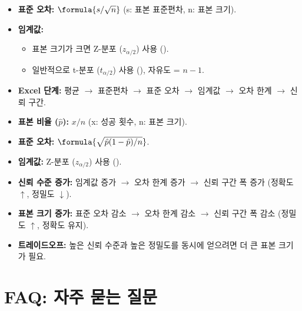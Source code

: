 \documentclass[11pt,a4paper]{article}
\theoremstyle{definition}
\begin{document}
\begin{infobox}[title=\textbf{모집단 평균에 대한 신뢰 구간}]
\begin{itemize}
    \item \textbf{표준 오차:} $\formula{s / \sqrt{n}}$ (s: 표본 표준편차, n: 표본 크기).
    \item \textbf{임계값:}
    \begin{itemize}
        \item 표본 크기가 크면 Z-분포 ($z_{\alpha/2}$) 사용 ().
        \item 일반적으로 t-분포 ($t_{\alpha/2}$) 사용 (), 자유도 = $n-1$.
    \end{itemize}
    \item \textbf{Excel 단계:} 평균 $\rightarrow$ 표준편차 $\rightarrow$ 표준 오차 $\rightarrow$ 임계값 $\rightarrow$ 오차 한계 $\rightarrow$ 신뢰 구간.
\end{itemize}
\end{infobox}

\begin{importantbox}[title=\textbf{모집단 비율에 대한 신뢰 구간}]
\begin{itemize}
    \item \textbf{표본 비율 ($\hat{p}$):} $x/n$ (x: 성공 횟수, n: 표본 크기).
    \item \textbf{표준 오차:} $\formula{\sqrt{\hat{p}(1-\hat{p})/n}}$.
    \item \textbf{임계값:} Z-분포 ($z_{\alpha/2}$) 사용 ().
\end{itemize}
\end{importantbox}

\begin{warningbox}[title=\textbf{신뢰 수준 및 표본 크기의 영향}]
\begin{itemize}
    \item \textbf{신뢰 수준 증가:} 임계값 증가 $\rightarrow$ 오차 한계 증가 $\rightarrow$ 신뢰 구간 폭 증가 (정확도 $\uparrow$, 정밀도 $\downarrow$).
    \item \textbf{표본 크기 증가:} 표준 오차 감소 $\rightarrow$ 오차 한계 감소 $\rightarrow$ 신뢰 구간 폭 감소 (정밀도 $\uparrow$, 정확도 유지).
    \item \textbf{트레이드오프:} 높은 신뢰 수준과 높은 정밀도를 동시에 얻으려면 더 큰 표본 크기가 필요.
\end{itemize}
\end{warningbox}

\newpage
\section{FAQ: 자주 묻는 질문}
\end{document}
